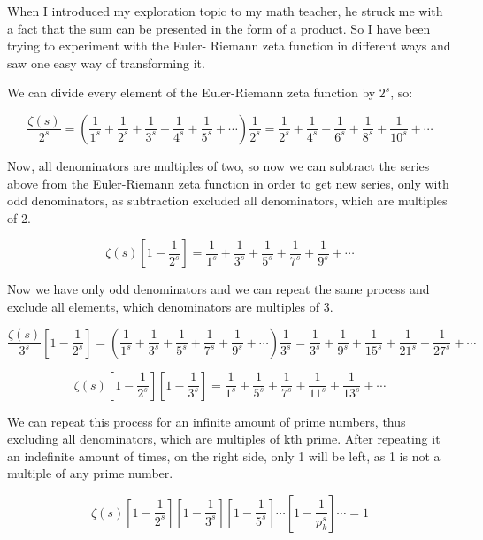 \documentclass[11pt]{article}
\begin{document}
When I introduced my exploration topic to my math teacher, he struck me with a
fact that the sum can be presented in the form of a product. So I have been
trying to experiment with the Euler- Riemann zeta function in different ways and
saw one easy way of transforming it. 

We can divide every element of the Euler-Riemann zeta function by \(2^s\), so:

\begin{equation*}
  \frac{\zeta(s)}{2^s}= (\frac{1}{1^s}+\frac{1}{2^s}+\frac{1}{3^s}+
  \frac{1}{4^s}+\frac{1}{5^s}+\cdots)\frac{1}{2^s}=
  \frac{1}{2^s}+\frac{1}{4^s}+\frac{1}{6^s}+
  \frac{1}{8^s}+\frac{1}{10^s}+\cdots
  \end{equation*}

Now, all denominators are multiples of two, so now we can subtract the series
above from the Euler-Riemann zeta function in order to get new series, only with
odd denominators, as subtraction excluded all denominators, which are multiples
of 2. 

\begin{equation*}
  \zeta(s)[1-\frac{1}{2^s}]=\frac{1}{1^s}+\frac{1}{3^s}+\frac{1}{5^s}+
  \frac{1}{7^s}+\frac{1}{9^s}+\cdots
  \end{equation*}

Now we have only odd denominators and we can repeat the same process and exclude
all elements, which denominators are multiples of 3.

\begin{equation*}
  \frac{\zeta(s)}{3^s}[1-\frac{1}{2^s}] = (\frac{1}{1^s}+\frac{1}{3^s}+\frac{1}{5^s}+
  \frac{1}{7^s}+\frac{1}{9^s}+\cdots)\frac{1}{3^s}=\frac{1}{3^s}+\frac{1}{9^s}+\frac{1}{15^s}+
  \frac{1}{21^s}+\frac{1}{27^s}+\cdots
\end{equation*}

\begin{equation*}
  \zeta(s)[1-\frac{1}{2^s}][1-\frac{1}{3^s}] = \frac{1}{1^s}+\frac{1}{5^s}+\frac{1}{7^s}+
  \frac{1}{11^s}+\frac{1}{13^s}+\cdots
  \end{equation*}

We can repeat this process for an infinite amount of prime numbers, thus
excluding all denominators, which are multiples of kth prime. After repeating it
an indefinite amount of times, on the right side, only 1 will be left, as 1 is
not a multiple of any prime number. 

\begin{equation*}
  \zeta(s)[1-\frac{1}{2^s}][1-\frac{1}{3^s}][1-\frac{1}{5^s}]\cdots[1-\frac{1}{p_k^s}]\cdots=1
  \end{equation*}
\end{document}
